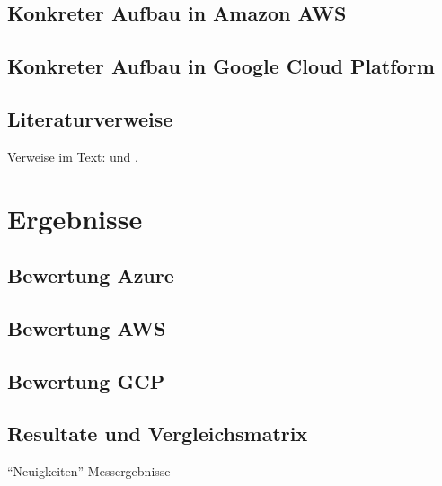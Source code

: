 \section{Konkreter Aufbau in Amazon AWS}

\section{Konkreter Aufbau in Google Cloud Platform}

\section{Literaturverweise}
\label{sec:real-literatur}

Verweise im Text: \cite{doc:stz} und \cite{doc:gun}.

\chapter{Ergebnisse}
\label{sec:ergeb}

\section{Bewertung Azure}

\section{Bewertung AWS}

\section{Bewertung GCP}

\section{Resultate und Vergleichsmatrix}

\enquote{Neuigkeiten} Messergebnisse
